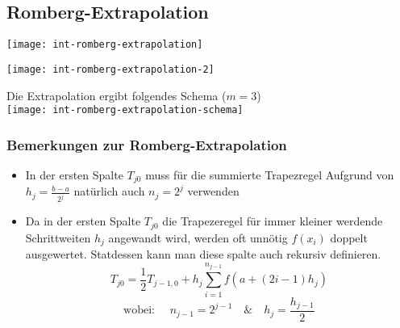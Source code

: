 \subsection{Romberg-Extrapolation}

\texttt{[image: int-romberg-extrapolation]}

\texttt{[image: int-romberg-extrapolation-2]}

{\Large Die Extrapolation ergibt folgendes Schema ($m = 3$)}\\
\texttt{[image: int-romberg-extrapolation-schema]}


\subsubsection{Bemerkungen zur Romberg-Extrapolation}

\begin{itemize}
	\item In der ersten Spalte $T_{j0}$ muss für die summierte Trapezregel Aufgrund
	      von $h_j = \frac{b-a}{2^j}$ natürlich auch $n_j = 2^j$ verwenden
	\item Da in der ersten Spalte $T_{j0}$ die Trapezeregel für immer kleiner
	      werdende Schrittweiten $h_j$ angewandt wird, werden oft unnötig $f(x_i)$
	      doppelt ausgewertet. Statdessen kann man diese spalte auch rekursiv definieren.
          $$T_{j0} = \frac{1}{2} T_{j-1,0} + h_j \sum_{i=1}^{n_{j-1}} f(a + (2i-1)h_j)$$
          $$\text{wobei: } \quad n_{j-1} = 2^{j-1} \quad \& \quad h_j = \frac{h_{j-1}}{2}$$
\end{itemize}



